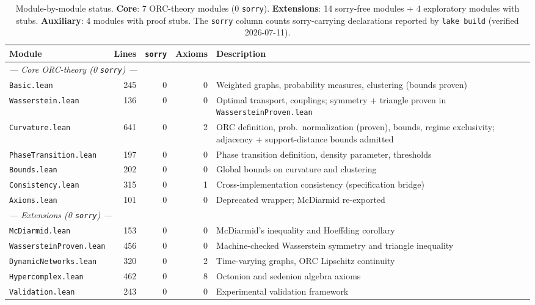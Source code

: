 \documentclass[12pt]{article}
\newcommand{\sorry}{\texttt{sorry}}
\begin{document}
\begin{table}[ht]
\centering
\caption{Module-by-module status. \textbf{Core}: 7 ORC-theory modules (0 \sorry{}).
\textbf{Extensions}: 14 sorry-free modules + 4 exploratory modules with stubs.
\textbf{Auxiliary}: 4 modules with proof stubs. The \sorry{} column counts sorry-carrying
declarations reported by \texttt{lake build} (verified 2026-07-11).}
\label{tab:lean}
\footnotesize\setlength{\tabcolsep}{4pt}
\begin{tabular}{l r r r p{5.8cm}}
\toprule
Module & Lines & \sorry{} & Axioms & Description \\
\midrule
\multicolumn{5}{l}{\itshape --- Core ORC-theory (0 \sorry{}) ---} \\
\texttt{Basic.lean}          & 245   & 0 & 0 & Weighted graphs, probability measures, clustering (bounds proven) \\
\texttt{Wasserstein.lean}    & 136   & 0 & 0 & Optimal transport, couplings; symmetry + triangle proven in \texttt{WassersteinProven.lean} \\
\texttt{Curvature.lean}      & 641   & 0 & 2 & ORC definition, prob.\ normalization (proven), bounds, regime exclusivity; adjacency + support-distance bounds admitted \\
\texttt{PhaseTransition.lean}& 197   & 0 & 0 & Phase transition definition, density parameter, thresholds \\
\texttt{Bounds.lean}         & 202   & 0 & 0 & Global bounds on curvature and clustering \\
\texttt{Consistency.lean}    & 315   & 0 & 1 & Cross-implementation consistency (specification bridge) \\
\texttt{Axioms.lean}         & 101   & 0 & 0 & Deprecated wrapper; McDiarmid re-exported \\
\midrule
\multicolumn{5}{l}{\itshape --- Extensions (0 \sorry{}) ---} \\
\texttt{McDiarmid.lean}           & 153 & 0 & 0 & McDiarmid's inequality and Hoeffding corollary \\
\texttt{WassersteinProven.lean}   & 456 & 0 & 0 & Machine-checked Wasserstein symmetry and triangle inequality \\
\texttt{DynamicNetworks.lean}     & 320 & 0 & 2 & Time-varying graphs, ORC Lipschitz continuity \\
\texttt{Hypercomplex.lean}        & 462 & 0 & 8 & Octonion and sedenion algebra axioms \\
\texttt{Validation.lean}          & 243 & 0 & 0 & Experimental validation framework \\

\end{tabular}
\end{table}
\end{document}
